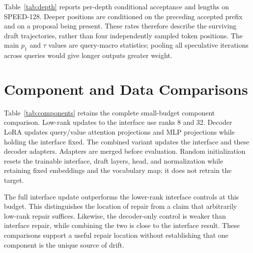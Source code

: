 Table~\ref{tab:depth} reports per-depth conditional acceptance and lengths on SPEED-128. Deeper positions are conditioned on the preceding accepted prefix and on a proposal being present. These rates therefore describe the surviving draft trajectories, rather than four independently sampled token positions. The main $p_1$ and $\tau$ values are query-macro statistics; pooling all speculative iterations across queries would give longer outputs greater weight.

\begin{table}[t]
\centering\small

\caption{\textbf{Conditional depth and output length on SPEED-128.} Percentages are query-macro conditional acceptance. R1 repair rows average three seeds; Nemotron rows use one. Brackets show 95\% query-and-seed bootstrap intervals (paired across repair and reuse). Length counts generated tokens under the 512-token ceiling.}
\label{tab:depth}
\end{table}

\section{Component and Data Comparisons}
\label{app:ablations}
\begin{table}[t]
\centering\small

\caption{\textbf{Complete small-budget component comparison.} R1-Llama, RedHat family initialization, 256 self-elicited examples, 300 training steps, one seed, SPEED-128, $K=4$. Calibration is training-free and fitted on a separate 256-example path; it is not a 300-step optimizer run. Intervals are paired query bootstrap intervals. Decoder LoRA is an update-scope control, not a reproduction of EDA.}
\label{tab:components}
\end{table}

Table~\ref{tab:components} retains the complete small-budget component comparison. Low-rank updates to the interface use ranks 8 and 32. Decoder LoRA updates query/value attention projections and MLP projections while holding the interface fixed. The combined variant updates the interface and these decoder adapters. Adapters are merged before evaluation. Random initialization resets the trainable interface, draft layers, head, and normalization while retaining fixed embeddings and the vocabulary map; it does not retrain the target.

The full interface update outperforms the lower-rank interface controls at this budget. This distinguishes the location of repair from a claim that arbitrarily low-rank repair suffices. Likewise, the decoder-only control is weaker than interface repair, while combining the two is close to the interface result. These comparisons support a useful repair location without establishing that one component is the unique source of drift.


